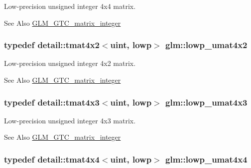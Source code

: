 Low-\/precision unsigned integer 4x4 matrix. \begin{DoxySeeAlso}{See Also}
\hyperlink{group__gtc__matrix__integer}{G\-L\-M\-\_\-\-G\-T\-C\-\_\-matrix\-\_\-integer} 
\end{DoxySeeAlso}
\hypertarget{group__gtc__matrix__integer_ga7583563f93096623d54ec8fddd806d13}{
\subsubsection[{lowp\-\_\-umat4x2}]{\setlength{\rightskip}{0pt plus 5cm}typedef detail\-::tmat4x2$<$uint, lowp$>$ {\bf glm\-::lowp\-\_\-umat4x2}}}\label{group__gtc__matrix__integer_ga7583563f93096623d54ec8fddd806d13}
Low-\/precision unsigned integer 4x2 matrix. \begin{DoxySeeAlso}{See Also}
\hyperlink{group__gtc__matrix__integer}{G\-L\-M\-\_\-\-G\-T\-C\-\_\-matrix\-\_\-integer} 
\end{DoxySeeAlso}
\hypertarget{group__gtc__matrix__integer_ga03af6e7ea92be81959305fc89a239cf5}{
\subsubsection[{lowp\-\_\-umat4x3}]{\setlength{\rightskip}{0pt plus 5cm}typedef detail\-::tmat4x3$<$uint, lowp$>$ {\bf glm\-::lowp\-\_\-umat4x3}}}\label{group__gtc__matrix__integer_ga03af6e7ea92be81959305fc89a239cf5}
Low-\/precision unsigned integer 4x3 matrix. \begin{DoxySeeAlso}{See Also}
\hyperlink{group__gtc__matrix__integer}{G\-L\-M\-\_\-\-G\-T\-C\-\_\-matrix\-\_\-integer} 
\end{DoxySeeAlso}
\hypertarget{group__gtc__matrix__integer_ga394ee910348beffe9c7d6b694d5efe5f}{
\subsubsection[{lowp\-\_\-umat4x4}]{\setlength{\rightskip}{0pt plus 5cm}typedef detail\-::tmat4x4$<$uint, lowp$>$ {\bf glm\-::lowp\-\_\-umat4x4}}}\label{group__gtc__matrix__integer_ga394ee910348beffe9c7d6b694d5efe5f}
